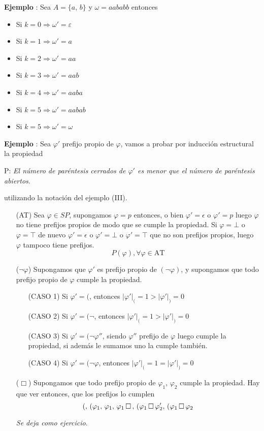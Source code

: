 \addtocounter{ej}{1} %
\textbf{Ejemplo }: Sea $A=\{ a,\,b \}$ y $\omega=aababb$ entonces 
\begin{multicols}{2}
\begin{itemize}
	\item Si $k=0 \Rightarrow \omega'=\varepsilon$
	\item Si $k=1 \Rightarrow \omega'=a$
	\item Si $k=2 \Rightarrow \omega'=aa$
	\item Si $k=3 \Rightarrow \omega'=aab$
	\item Si $k=4 \Rightarrow \omega'=aaba$
	\item Si $k=5 \Rightarrow \omega'=aabab$
	\item Si $k=5 \Rightarrow \omega'=\omega$		
\end{itemize}
\end{multicols}
\addtocounter{ej}{1} %
\textbf{Ejemplo }: Sea $\varphi'$ prefijo propio de $\varphi$, vamos a probar por inducción estructural la propiedad 
\begin{center}
P: \textit{El número de paréntesis cerrados de $\varphi'$ es menor que el número de paréntesis abiertos}.
\end{center}
utilizando la notación del ejemplo (III).
\begin{itemize}
	\item[(AT)] Sea $\varphi \in SP$, supongamos $\varphi=p$ entonces, o bien $\varphi'=\epsilon$ o $\varphi'=p$ luego $\varphi$ no tiene prefijos propios de modo que se cumple la propiedad. Si $\varphi=\bot$ o $\varphi = \top$ de nuevo $\varphi'=\epsilon$ o $\varphi'=\bot$ o $\varphi'=\top$ que no son prefijos propios, luego $\varphi$ tampoco tiene prefijos. 
	\[ P(\varphi), \forall \varphi \in \mbox{AT} \]
	\item[($\lnot \varphi$)] Supongamos que $\varphi'$ es prefijo propio de $(\lnot \varphi)$, y supongamos que todo prefijo propio de $\varphi$ cumple la propiedad. 
	\begin{itemize}
		\item[(CASO 1)] Si $\varphi'=($, entonces $\vert \varphi' \vert_{(}=1 > \vert \varphi' \vert_{)}=0$
		\item[(CASO 2)] Si $\varphi'=(\lnot$, entonces $\vert \varphi' \vert_{(}=1 > \vert \varphi' \vert_{)}=0$
		\item[(CASO 3)] Si $\varphi'=(\lnot \varphi''$, siendo $\varphi''$ prefijo de $\varphi$ luego cumple la propiedad, si además le sumamos uno la cumple también. 
		\item[(CASO 4)] Si $\varphi'=(\lnot \varphi$, entonces $\vert \varphi' \vert_{(}=1 = \vert \varphi' \vert_{)}=0 $
\end{itemize}	 
 \item[($\Box$)] Supongamos que todo prefijo propio de $\varphi_1$,  $\varphi_2$ cumple la propiedad. Hay que ver entonces, que los prefijos lo cumplen 
 \[(, \, (\varphi_1, \, \varphi_1, \, \varphi_1 \, \Box \,, \, (\varphi_1 \, \Box \, \varphi_2', \, (\varphi_1 \, \Box \, \varphi_2  \]
 \begin{flushright}
 \textit{Se deja como ejercicio}.
 \end{flushright}
\end{itemize}

